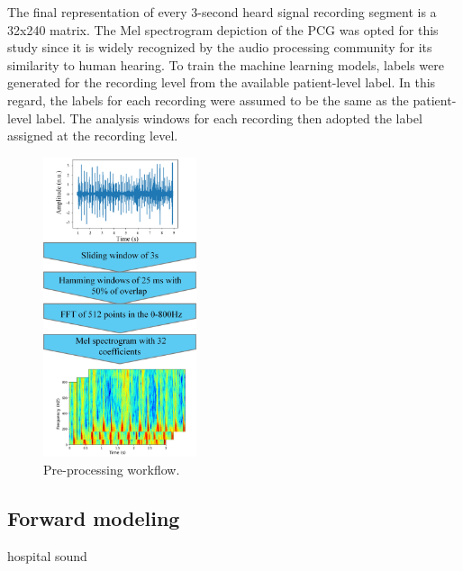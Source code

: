 \documentclass{article}
\begin{document}
\par The final representation of every 3-second heard signal recording segment is a 32x240 matrix. The Mel spectrogram depiction of the PCG was opted for this study since it is widely recognized by the audio processing community for its similarity to human hearing. To train the machine learning models, labels were generated for the recording level from the available patient-level label. In this regard, the labels for each recording were assumed to be the same as the patient-level label. The analysis windows for each recording then adopted the label assigned at the recording level.


\begin{figure}
\centering
    \includegraphics[width=0.4\textwidth]{Documents/preprecessing.jpg}
    \caption{Pre-processing workflow.}
    \label{fig:PP}

\end{figure}


\subsection{Forward modeling}
hospital sound
\end{document}
